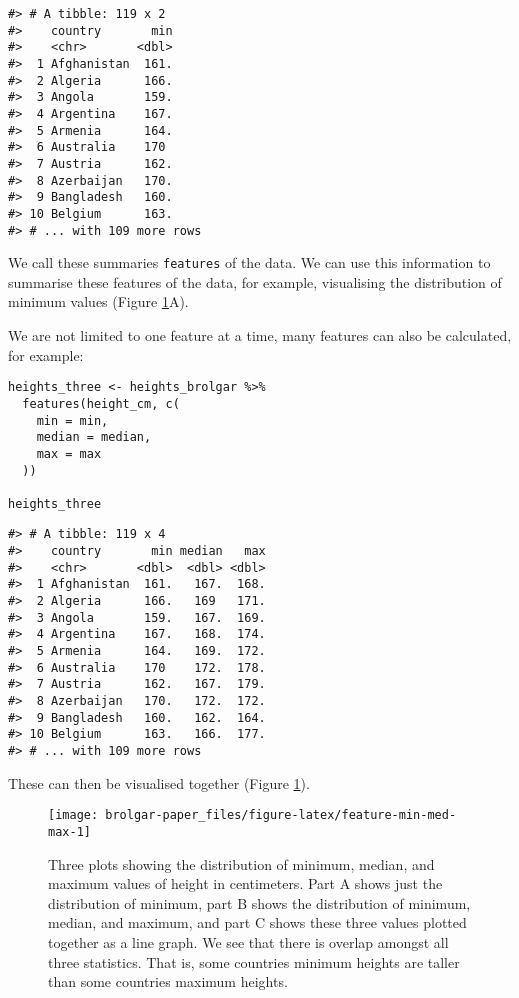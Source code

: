 \begin{verbatim}
#> # A tibble: 119 x 2
#>    country       min
#>    <chr>       <dbl>
#>  1 Afghanistan  161.
#>  2 Algeria      166.
#>  3 Angola       159.
#>  4 Argentina    167.
#>  5 Armenia      164.
#>  6 Australia    170 
#>  7 Austria      162.
#>  8 Azerbaijan   170.
#>  9 Bangladesh   160.
#> 10 Belgium      163.
#> # ... with 109 more rows
\end{verbatim}

We call these summaries \texttt{features} of the data. We can use this information to summarise these features of the data, for example, visualising the distribution of minimum values (Figure \ref{fig:feature-min-med-max}A).

We are not limited to one feature at a time, many features can also be calculated, for example:

\begin{verbatim}
heights_three <- heights_brolgar %>%
  features(height_cm, c(
    min = min,
    median = median,
    max = max
  ))

heights_three
\end{verbatim}

\begin{verbatim}
#> # A tibble: 119 x 4
#>    country       min median   max
#>    <chr>       <dbl>  <dbl> <dbl>
#>  1 Afghanistan  161.   167.  168.
#>  2 Algeria      166.   169   171.
#>  3 Angola       159.   167.  169.
#>  4 Argentina    167.   168.  174.
#>  5 Armenia      164.   169.  172.
#>  6 Australia    170    172.  178.
#>  7 Austria      162.   167.  179.
#>  8 Azerbaijan   170.   172.  172.
#>  9 Bangladesh   160.   162.  164.
#> 10 Belgium      163.   166.  177.
#> # ... with 109 more rows
\end{verbatim}

These can then be visualised together (Figure \ref{fig:feature-min-med-max}).

\begin{figure}

{\centering \texttt{[image: brolgar-paper\_files/figure-latex/feature-min-med-max-1]} 

}

\caption{Three plots showing the distribution of minimum, median, and maximum values of height in centimeters. Part A shows just the distribution of minimum, part B shows the distribution of minimum, median, and maximum, and part C shows these three values plotted together as a line graph. We see that there is overlap amongst all three statistics. That is, some countries minimum heights are taller than some countries maximum heights.}\label{fig:feature-min-med-max}
\end{figure}

